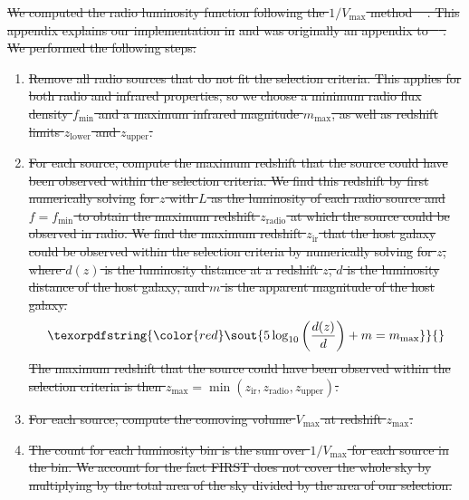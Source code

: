 \documentclass[11pt, a4paper]{book}
\providecommand{\DIFdeltex}[1]{{\protect\color{red}\sout{#1}}}                      %
\providecommand{\DIFdel}[1]{\texorpdfstring{\DIFdeltex{#1}}{}} %
\begin{document}
\DIFdel{We computed the radio luminosity function following the $1/V_{\max}$ method
  \mbox{%
\citep{schmidt1968vmax}}\hspace{0pt}%
. This appendix explains our implementation in }%
\DIFdel{and was originally an appendix to \mbox{%
\citet{alger21rlfs}}\hspace{0pt}%
. We performed the
  following steps:
  }%
\begin{enumerate}%
\item%
\DIFdel{Remove all radio sources that do not fit the selection criteria.
      This applies for both radio and infrared properties, so we choose a minimum radio flux density $f_{\min}$ and a maximum infrared magnitude
      $m_{\max}$, as well as redshift limits $z_{\mathrm{lower}}$ and $z_{\mathrm{upper}}$.
    }%
\item%
\DIFdel{For each source, compute the maximum redshift that the source could
      have been observed within the selection criteria. We find this redshift
      by first numerically solving }%
\DIFdel{for $z$ with $L$ as
      the luminosity of each radio source and $f = f_{\min}$ to obtain the
      maximum redshift $z_\text{radio}$ at which the source could be observed
      in radio. We find the maximum redshift $z_{\text{ir}}$ that the host
      galaxy could be observed within the selection criteria by numerically
      solving }%
\DIFdel{for $z$, where $d(z)$ is the luminosity
      distance at a redshift $z$, $d$ is the luminosity distance of the host
      galaxy, and $m$ is the apparent magnitude of the host galaxy.
      }\begin{displaymath}
        \DIFdel{%
        5 \log_{10}\left(\frac{d(z)}{d}\right) + m = m_{\max}
      }\end{displaymath}%
\DIFdel{The maximum redshift that the source could have been observed within the
      selection criteria is then $z_{\mathrm{max}} = \min(z_{\mathrm{ir}}, z_{\mathrm{radio}}, z_{\mathrm{upper}})$.
    }%
\item%
\DIFdel{For each source, compute the comoving volume $V_{\mathrm{max}}$ at
      redshift $z_{\mathrm{max}}$.
    }%
\item%
\DIFdel{The count for each luminosity bin is the sum over $1 / V_{\max}$ for
      each source in the bin. We account for the fact FIRST does not cover the
      whole sky by multiplying by the total area of the sky divided by the area
      of our selection.
  }
\end{enumerate}%
\end{document}
